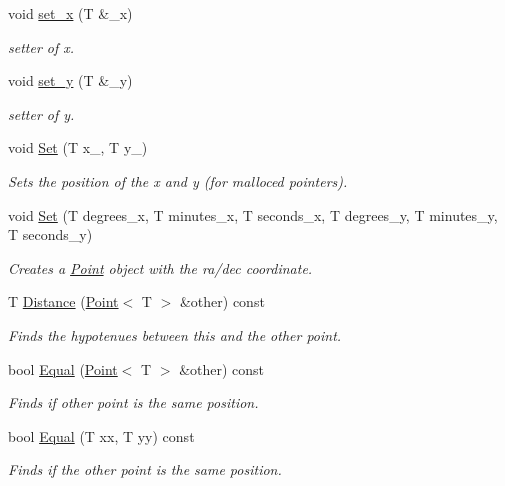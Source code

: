 \begin{DoxyCompactItemize}
void \hyperlink{classutil_1_1Point_a6111d60c3e51f1aaa4d73b2fd24d0789}{set\+\_\+x} (T \&\+\_\+x)
\begin{DoxyCompactList}\small\item\em setter of x. \end{DoxyCompactList}\item 
void \hyperlink{classutil_1_1Point_aeb4963095d32bf0ab74f4f8c7762e1db}{set\+\_\+y} (T \&\+\_\+y)
\begin{DoxyCompactList}\small\item\em setter of y. \end{DoxyCompactList}\item 
void \hyperlink{classutil_1_1Point_aae6e38572d0141a2a819dfab3ea15eae}{Set} (T x\+\_\+, T y\+\_\+)
\begin{DoxyCompactList}\small\item\em Sets the position of the x and y (for malloced pointers). \end{DoxyCompactList}\item 
void \hyperlink{classutil_1_1Point_adc1fb46aa99606d6eb31767ea6527432}{Set} (T degrees\+\_\+x, T minutes\+\_\+x, T seconds\+\_\+x, T degrees\+\_\+y, T minutes\+\_\+y, T seconds\+\_\+y)
\begin{DoxyCompactList}\small\item\em Creates a \hyperlink{classutil_1_1Point}{Point} object with the ra/dec coordinate. \end{DoxyCompactList}\item 
T \hyperlink{classutil_1_1Point_a8f90a6d1ce481f74c1d8790f4e30770a}{Distance} (\hyperlink{classutil_1_1Point}{Point}$<$ T $>$ \&other) const
\begin{DoxyCompactList}\small\item\em Finds the hypotenues between this and the other point. \end{DoxyCompactList}\item 
bool \hyperlink{classutil_1_1Point_a1f0490a8d366dccc9e09ac5217c74f50}{Equal} (\hyperlink{classutil_1_1Point}{Point}$<$ T $>$ \&other) const
\begin{DoxyCompactList}\small\item\em Finds if other point is the same position. \end{DoxyCompactList}\item 
bool \hyperlink{classutil_1_1Point_a291fdc97f84d3271509b9137969749eb}{Equal} (T xx, T yy) const
\begin{DoxyCompactList}\small\item\em Finds if the other point is the same position. \end{DoxyCompactList}\end{DoxyCompactItemize}
